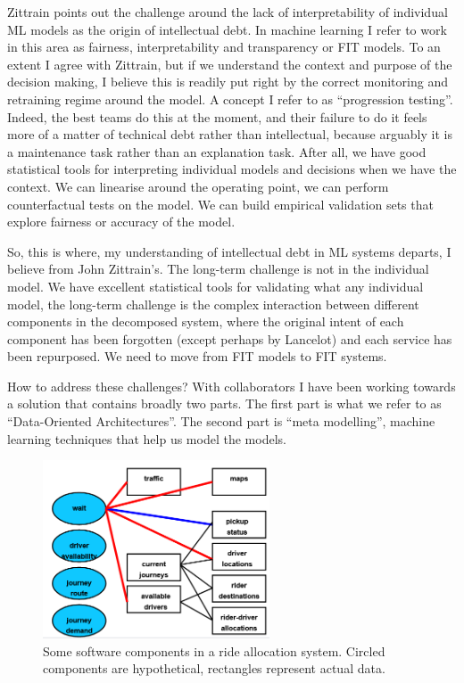 \documentclass[a4paper]{caesar_book}
\begin{document}
Zittrain points out the challenge around the lack of interpretability of individual ML models as the origin of intellectual debt. In machine learning I refer to work in this area as fairness, interpretability and transparency or FIT models. To an extent I agree with Zittrain, but if we understand the context and purpose of the decision making, I believe this is readily put right by the correct monitoring and retraining regime around the model. A concept I refer to as ``progression testing''. Indeed, the best teams do this at the moment, and their failure to do it feels more of a matter of technical debt rather than intellectual, because arguably it is a maintenance task rather than an explanation task. After all, we have good statistical tools for interpreting individual models and decisions when we have the context. We can linearise around the operating point, we can perform counterfactual tests on the model. We can build empirical validation sets that explore fairness or accuracy of the model.

So, this is where, my understanding of intellectual debt in ML systems departs, I believe from John Zittrain’s. The long-term challenge is not in the individual model. We have excellent statistical tools for validating what any individual model, the long-term challenge is the complex interaction between different components in the decomposed system, where the original intent of each component has been forgotten (except perhaps by Lancelot) and each service has been repurposed. We need to move from FIT models to FIT systems.

How to address these challenges? With collaborators I have been working towards a solution that contains broadly two parts. The first part is what we refer to as ``Data-Oriented Architectures''. The second part is ``meta modelling'', machine learning techniques that help us model the models.

\begin{figure}%
	\includegraphics[width=0.6\textwidth,keepaspectratio]{pictures/boda_1.PNG}%
	\caption*{Some software components in a ride allocation system. Circled components are hypothetical, rectangles represent actual data.}%
\end{figure}%
\end{document}
